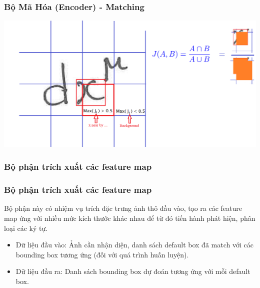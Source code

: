 \documentclass{beamer}
\begin{document}
	
	
	
	\begin{frame}
		\frametitle{Bộ Mã Hóa (Encoder) - Matching}
		\begin{center}
			\centering
			\includegraphics[width=0.95\linewidth]{GT_BB2.png}
			\vspace{0.5cm}
		\end{center}
	\end{frame}
	
	
	
	\subsubsection{Bộ phận trích xuất các feature map}
	\begin{frame}
		\frametitle{Bộ phận trích xuất các feature map}
		Bộ phận này có nhiệm vụ trích đặc trưng ảnh thô đầu vào, tạo ra các feature map ứng với nhiều mức kích thước khác nhau để từ đó tiến hành phát hiện, phân loại các ký tự.
		
		\begin{itemize}
			\item Dữ liệu đầu vào: Ảnh cần nhận diện, danh sách default box đã match với các bounding box tương ứng (đối với quá trình huấn luyện).
			\item Dữ liệu đầu ra: Danh sách bounding box dự đoán tương ứng với mỗi default box.
		\end{itemize}
		
		
		
		
		
	\end{frame}
	
\end{document}
